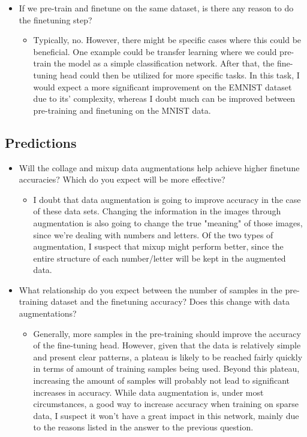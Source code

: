 \documentclass[english,11pt,a4paper,titlepage]{report}
\begin{document}
\begin{itemize}
\begin{itemize}
		\end{itemize}
		\item If we pre-train and finetune on the same dataset, is there any reason to do the finetuning step?
		\begin{itemize}
			\item Typically, no. However, there might be specific cases where this could be beneficial. One example could be transfer learning where we could pre-train the model as a simple classification network. After that, the fine-tuning head could then be utilized for more specific tasks. In this task, I would expect a more significant improvement on the EMNIST dataset due to its' complexity, whereas I doubt much can be improved between pre-training and finetuning on the MNIST data.
		\end{itemize}
	\end{itemize}
	\subsection*{Predictions}
	\begin{itemize}
		\item Will the collage and mixup data augmentations help achieve higher finetune accuracies? Which do you expect will be more effective?
		\begin{itemize}
			\item I doubt that data augmentation is going to improve accuracy in the case of these data sets. Changing the information in the images through augmentation is also going to change the true "meaning" of those images, since we're dealing with numbers and letters. Of the two types of augmentation, I suspect that mixup might perform better, since the entire structure of each number/letter will be kept in the augmented data.
		\end{itemize}
		\item What relationship do you expect between the number of samples in the pre-training dataset and the finetuning accuracy? Does this change with data augmentations?
		\begin{itemize}
			\item Generally, more samples in the pre-training should improve the accuracy of the fine-tuning head. However, given that the data is relatively simple and present clear patterns, a plateau is likely to be reached fairly quickly in terms of amount of training samples being used. Beyond this plateau, increasing the amount of samples will probably not lead to significant increases in accuracy. While data augmentation is, under most circumstances, a good way to increase accuracy when training on sparse data, I suspect it won't have a great impact in this network, mainly due to the reasons listed in the answer to the previous question.
		\end{itemize}
	\end{itemize}
	
\end{document}
